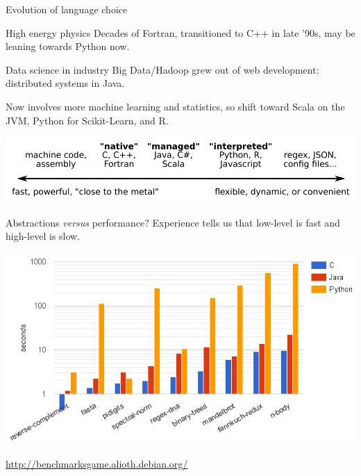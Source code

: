 \documentclass{beamer}
\begin{document}
\begin{frame}{Evolution of language choice}
\vspace{0.5 cm}
\begin{block}{High energy physics}
Decades of Fortran, transitioned to C++ in late '90s, may be leaning towards Python now.
\end{block}

\begin{block}{Data science in industry}
Big Data/Hadoop grew out of web development: distributed systems in Java.

\vspace{0.25 cm}
Now involves more machine learning and statistics, so shift toward Scala on the JVM, Python for Scikit-Learn, and R.
\end{block}

\vspace{0.5 cm}
\includegraphics[width=\linewidth]{languages1.pdf}
\end{frame}

\begin{frame}{Abstractions {\it versus} performance?}
\vspace{0.5 cm}
Experience tells us that low-level is fast and high-level is slow.

\vspace{0.5 cm}
\includegraphics[width=\linewidth]{benchmark-games.png}

\hfill \textcolor{blue}{\small \url{http://benchmarksgame.alioth.debian.org/}}
\end{frame}
\end{document}
